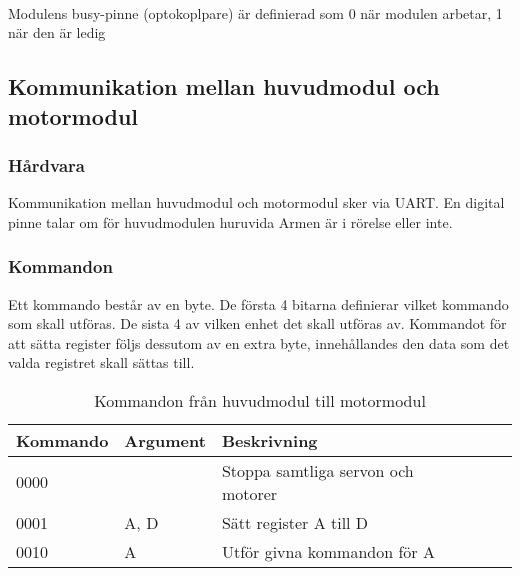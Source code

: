  \\

Modulens busy-pinne (optokoplpare) är definierad som 0 när modulen arbetar, 1 när den är ledig

\subsection{Kommunikation mellan huvudmodul och motormodul}

\subsubsection{Hårdvara}
Kommunikation mellan huvudmodul och motormodul sker via UART. En digital pinne talar om för huvudmodulen huruvida Armen är i rörelse eller inte.

\subsubsection{Kommandon}
Ett kommando består av en byte. De första 4 bitarna definierar vilket kommando som skall utföras. De sista 4 av vilken enhet det skall utföras av. Kommandot för att sätta register följs dessutom av en extra byte, innehållandes den data som det valda registret skall sättas till. 

\begin{table}[h]
	\centering
		\begin{tabularx}{\textwidth}{| l | l | X | l | l |}
			\hline
			\textbf{Kommando} & \textbf{Argument} & \textbf{Beskrivning} \\
			\hline
			{0000} & {} & {Stoppa samtliga servon och motorer} \\
			\hline
			{0001} & {A, D} & {Sätt register A till D} \\
			\hline
			{0010} & {A} & {Utför givna kommandon för A} \\
			\hline
		\end{tabularx}
	\caption{Kommandon från huvudmodul till motormodul} \label{protokoll:pc-motor}
\end{table}

